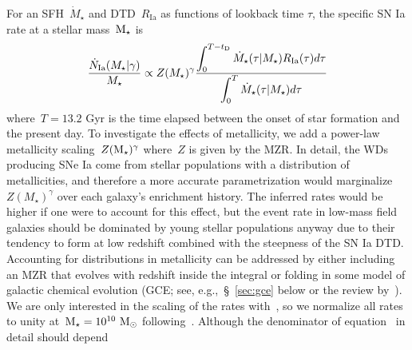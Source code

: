 \documentclass[foo.tex]{subfiles}
\begin{document}
For an SFH~$\dot{M}_\star$ and DTD~$R_\text{Ia}$ as functions of lookback time
$\tau$, the specific SN Ia rate at a stellar mass~$\text{M}_\star$ is
\begin{equation}
\frac{\dot{N}_\text{Ia}(M_\star | \gamma)}{M_\star} \propto Z(M_\star)^\gamma
\frac{\displaystyle{
	\int_0^{T - t_\text{D}}\dot{M}_\star(\tau | M_\star) R_\text{Ia}(\tau) d\tau
}}{\displaystyle{
	\int_0^T \dot{M}_\star(\tau | M_\star) d\tau
}}
\label{eq:specia}
\end{equation}
where~$T = 13.2$ Gyr is the time elapsed between the onset of star formation
and the present day.
To investigate the effects of metallicity, we add a power-law metallicity
scaling~$Z(\text{M}_\star)^\gamma$ where~$Z$ is given by the MZR.
{\color{red}
In detail, the WDs producing SNe Ia come from stellar populations with a
distribution of metallicities, and therefore a more accurate parametrization
would marginalize~$Z(M_\star)^\gamma$ over each galaxy's enrichment history.
The inferred rates would be higher if one were to account for this effect, but
the event rate in low-mass field galaxies should be dominated by young stellar
populations anyway due to their tendency to form at low redshift combined with
the steepness of the SN Ia DTD.
Accounting for distributions in metallicity can be addressed by either
including an MZR that evolves with redshift inside the integral or folding in
some model of galactic chemical evolution (GCE; see,
e.g.,~\S~\ref{sec:gce} below or the review by~\citealp{Matteucci2021}).
}
We are only interested in the scaling of the rates with~\mstar, so we normalize
all rates to unity at~$\text{M}_\star = 10^{10}~\text{M}_\odot$ following~\citet{Brown2019}.
Although the denominator of equation~ in detail should depend
\end{document}
